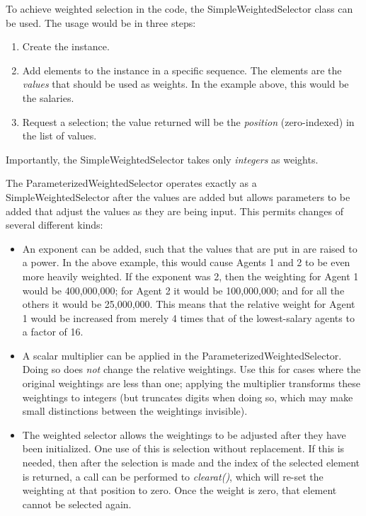 To achieve weighted selection in the \rhpc code, the SimpleWeightedSelector class can be used. The usage would be in three steps:

\begin{enumerate}
\item Create the instance.
\item Add elements to the instance in a specific sequence. The elements are the \textit{values} that should be used as weights. In the example above, this would be the salaries.
\item Request a selection; the value returned will be the \textit{position} (zero-indexed) in the list of values. 
\end{enumerate}

Importantly, the SimpleWeightedSelector takes only \textit{integers} as weights. 

The ParameterizedWeightedSelector operates exactly as a SimpleWeightedSelector after the values are added but allows parameters to be added that adjust the values as they are being input. This permits changes of several different kinds:

\begin{itemize}
\item An exponent can be added, such that the values that are put in are raised to a power. In the above example, this would cause Agents 1 and 2 to be even more heavily weighted. If the exponent was 2, then the weighting for Agent 1 would be 400,000,000; for Agent 2 it would be 100,000,000; and for all the others it would be 25,000,000. This means that the relative weight for Agent 1 would be increased from merely 4 times that of the lowest-salary agents to a factor of 16.
\item A scalar multiplier can be applied in the ParameterizedWeightedSelector. Doing so does \textit{not} change the relative weightings. Use this for cases where the original weightings are less than one; applying the multiplier transforms these weightings to integers (but truncates digits when doing so, which may make small distinctions between the weightings invisible).
\item The weighted selector allows the weightings to be adjusted after they have been initialized. One use of this is selection without replacement. If this is needed, then after the selection is made and the index of the selected element is returned, a call can be performed to \textit{clearat()}, which will re-set the weighting at that position to zero. Once the weight is zero, that element cannot be selected again.
\end{itemize}

